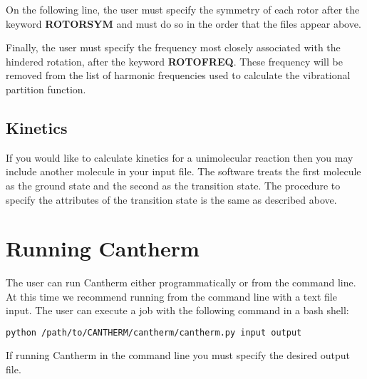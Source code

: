 \documentclass[a4paper,12pt]{article}
\begin{document}
On the following line, the user must specify the symmetry of each rotor after the keyword \textbf{ROTORSYM} and must do so in the order that the files appear above.

Finally, the user must specify the frequency most closely associated with the hindered rotation, after the keyword \textbf{ROTOFREQ}. These frequency will be removed from the list of harmonic frequencies used to calculate the vibrational partition function.

\subsection{Kinetics}
If you would like to calculate kinetics for a unimolecular reaction then you may include another molecule in your input file. The software treats the first molecule as the ground state and the second as the transition state. The procedure to specify the attributes of the transition state is the same as described above.

\section{Running Cantherm}
The user can run Cantherm either programmatically or from the command line. At this time we recommend running from the command line with a text file input. The user can execute a job with the following command in a bash shell:

\begin{lstlisting}[language=bash]
python /path/to/CANTHERM/cantherm/cantherm.py input output
\end{lstlisting}

If running Cantherm in the command line you must specify the desired output file.
\end{document}
